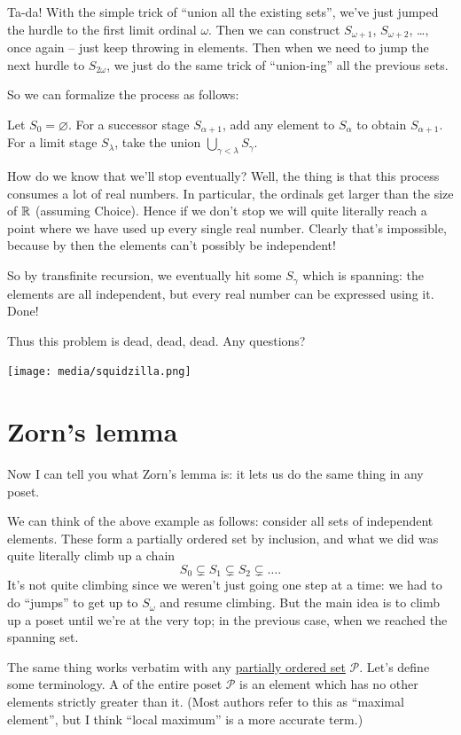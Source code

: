 Ta-da!
With the simple trick of ``union all the existing sets'',
we've just jumped the hurdle to the first limit ordinal $\omega$.
Then we can construct $S_{\omega+1}$, $S_{\omega+2}$, \dots, once again --
just keep throwing in elements.
Then when we need to jump the next hurdle to $S_{2 \omega}$,
we just do the same trick of ``union-ing'' all the previous sets.

So we can formalize the process as follows:
\begin{enumerate}
	\ii Let $S_0 = \varnothing$.
	\ii For a successor stage $S_{\alpha+1}$, add any element to $S_\alpha$ to obtain $S_{\alpha+1}$.
	\ii For a limit stage $S_{\lambda}$, take the union $\bigcup_{\gamma < \lambda} S_\gamma$.
\end{enumerate}
How do we know that we'll stop eventually?
Well, the thing is that this process consumes a lot of real numbers.
In particular, the ordinals get larger than the size of $\mathbb R$ (assuming Choice).
Hence if we don't stop we will quite literally reach a point where we have used up every single real number.
Clearly that's impossible, because by then the elements can't possibly be independent!

So by transfinite recursion, we eventually hit some $S_\gamma$ which is spanning:
the elements are all independent, but every real number can be expressed using it.  Done!


Thus this problem is dead, dead, dead. Any questions?
\begin{center}
	\texttt{[image: media/squidzilla.png]}
\end{center}


\section{Zorn's lemma}
Now I can tell you what Zorn's lemma is:
it lets us do the same thing in any poset.

We can think of the above example as follows:
consider all sets of independent elements.
These form a partially ordered set by inclusion, and what we did
was quite literally climb up a chain
\[ S_0 \subsetneq S_1 \subsetneq S_2 \subsetneq \dots. \]
It's not quite climbing since we weren't just going one step at a time:
we had to do ``jumps'' to get up to $S_\omega$ and resume climbing.
But the main idea is to climb up a poset until we're at the very top;
in the previous case, when we reached the spanning set.

The same thing works verbatim with any \href{http://en.wikipedia.org/wiki/Partially_ordered_set}{partially ordered set}
$\mathcal P$.
Let's define some terminology.
A  of the entire poset $\mathcal P$ is an element
which has no other elements strictly greater than it.
(Most authors refer to this as ``maximal element'', but I think
``local maximum'' is a more accurate term.)

